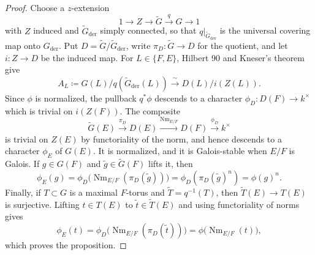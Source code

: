 \documentclass[reqno]{amsart}
\numberwithin{equation}{subsection}
\newcommand{\Gal}{\operatorname{Gal}}
\newcommand{\co}{\colon}
\DeclareMathOperator{\Nm}{Nm}
\DeclareMathOperator{\der}{der}
\DeclareMathOperator{\Fr}{Fr}
\newcommand{\rH}{\ensuremath{\mathrm{H}}\xspace}
\theoremstyle{remark}
\numberwithin{equation}{subsection}
\numberwithin{figure}{subsection}
\begin{document}
\begin{proof}
Choose a $z$-extension
\[
1\longrightarrow Z\longrightarrow\widetilde G\xrightarrow{q}G\longrightarrow1
\]
with $Z$ induced and $\widetilde G_{\der}$ simply connected, so that $q|_{\widetilde G_{\der}}$ is the universal covering map onto $G_{\der}$. Put $D=\widetilde G/\widetilde G_{\der}$, write $\pi_D\co\widetilde G\to D$ for the quotient, and let $i\co Z\to D$ be the induced map. For $L\in\{F,E\}$, Hilbert 90 and Kneser's theorem \cite[Theorem 10.6.4]{KP} give
\[
A_L\coloneqq G(L)/q(\widetilde G_{\der}(L))
\xrightarrow{\ \sim\ }D(L)/i(Z(L)).
\]
Since $\phi$ is normalized, the pullback $q^*\phi$ descends to a character $\phi_D\co D(F)\to k^\times$ which is trivial on $i(Z(F))$. The composite
\[
\widetilde G(E)\xrightarrow{\pi_D}D(E)
\xrightarrow{\Nm_{E/F}}D(F)
\xrightarrow{\phi_D}k^\times
\]
is trivial on $Z(E)$ by functoriality of the norm, and hence descends to a character $\phi_E$ of $G(E)$. It is normalized, and it is Galois-stable when $E/F$ is Galois. If $g\in G(F)$ and $\widetilde g\in\widetilde G(F)$ lifts it, then
\[
\phi_E(g)=\phi_D\bigl(\Nm_{E/F}(\pi_D(\widetilde g))\bigr)
=\phi_D(\pi_D(\widetilde g)^n)=\phi(g)^n.
\]
Finally, if $T\subset G$ is a maximal $F$-torus and $\widetilde T=q^{-1}(T)$, then $\widetilde T(E)\to T(E)$ is surjective. Lifting $t\in T(E)$ to $\widetilde t\in\widetilde T(E)$ and using functoriality of norms gives
\[
\phi_E(t)
=\phi_D\bigl(\Nm_{E/F}(\pi_D(\widetilde t))\bigr)
=\phi\bigl(\Nm_{E/F}(t)\bigr),
\]
which proves the proposition.
\end{proof}
\end{document}
